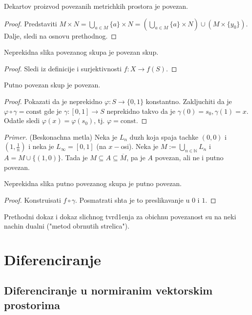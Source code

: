 \documentclass[a4paper,12pt]{article}
\newcommand{\NN}{\mathbb{N}}
\newcommand{\psj}{\subseteq}
\newcommand{\const}{\mathrm{const}}
\newcommand{\pr}{\noindent\textit{Primer.} }
\begin{document}
\begin{posl}
Dekartov proizvod povezanih metrichkih prostora je povezan.
\end{posl}
\begin{proof}
Predstaviti $M \times N = \bigcup_{a\in M} \{a\} \times N = (\bigcup_{a\in M} \{a\} \times N) \cup
(M \times  \{y_0\})$. Dalje, sledi na osnovu prethodnog.
\end{proof}

\begin{tvr}
Neprekidna slika povezanog skupa je povezan skup.
\end{tvr}
\begin{proof}
Sledi iz definicije i surjektivnosti $f: X \to f(S)$.
\end{proof}

\begin{tvr}
Putno povezan skup je povezan.
\end{tvr}
\begin{proof}
Pokazati da je neprekidno $\varphi: S \to \{0,1\}$ konstantno. Zakljuchiti da je $\varphi \circ \gamma = \const$ gde je $\gamma:[0,1] \to S$ neprekidno takvo da je $\gamma(0) = s_0, \gamma(1) = x$. Odatle sledi $\varphi(x) = \varphi(s_0)$, tj. $\varphi = \const$.
\end{proof}

\pr (Beskonachna metla) Neka je $L_n$ duzh koja spaja tachke $(0, 0)$ i $(1, \frac{1}{n})$ i neka je $L_\infty = [0, 1]$ (na $x-$osi). Neka je $M := \bigcup_{n \in \NN} L_n$ i
$ A  = M \cup \{(1, 0)\}$. Tada je $M \psj A \psj \overline M$, pa je $A$ povezan, ali ne i putno povezan.

\begin{tvr}
Neprekidna slika putno povezanog skupa je putno povezan.
\end{tvr}
\begin{proof}
Konstruisati $f \circ \gamma$. Posmatrati shta je to preslikavanje u $0$ i $1$.
\end{proof}

\begin{nap}
Prethodni dokaz i dokaz slichnog tvrd1enja za obichnu povezanost su na neki nachin dualni ("metod obrnutih strelica").
\end{nap}

\section{Diferenciranje}
\subsection{Diferenciranje u normiranim vektorskim prostorima}
\end{document}
